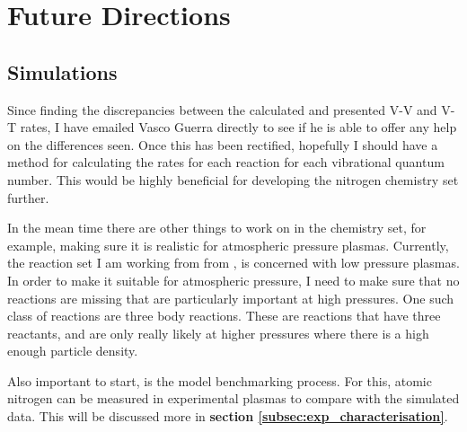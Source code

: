 \documentclass[11pt, oneside]{article}   	%
\newcommand{\todo}[1]{ \textcolor{red}{\bf{To Do:} #1}}
\begin{document}
\section{Future Directions}

\subsection{Simulations}

Since finding the discrepancies between the calculated and presented V-V and V-T rates, I have emailed Vasco Guerra directly to see if he is able to offer any help on the differences seen.
Once this has been rectified, hopefully I should have a method for calculating the rates for each reaction for each vibrational quantum number.
This would be highly beneficial for developing the nitrogen chemistry set further.

In the mean time there are other things to work on in the chemistry set, for example, making sure it is realistic for atmospheric pressure plasmas.
Currently, the reaction set I am working from from \cite{Kutasi2016tuning}, is concerned with low pressure plasmas.
In order to make it suitable for atmospheric pressure, I need to make sure that no reactions are missing that are particularly important at high pressures.
One such class of reactions are three body reactions.
These are reactions that have three reactants, and are only really likely at higher pressures where there is a high enough particle density.

Also important to start, is the model benchmarking process.
For this, atomic nitrogen can be measured in experimental plasmas to compare with the simulated data.
This will be discussed more in \textbf{section \ref{subsec:exp_characterisation}}.
\end{document}
